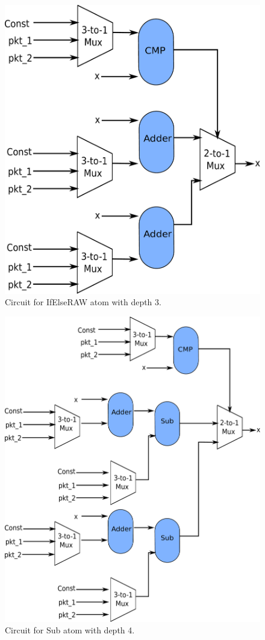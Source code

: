 \begin{figure}[!htbp]
  \includegraphics[width=\columnwidth]{if_else.pdf}
  \caption{Circuit for IfElseRAW atom with depth 3.}
  \label{fig:ifelseraw}
\end{figure}
\begin{figure}[!htbp]
  \includegraphics[width=\columnwidth]{sub.pdf}
  \caption{Circuit for Sub atom with depth 4.}
  \label{fig:sub}
\end{figure}

